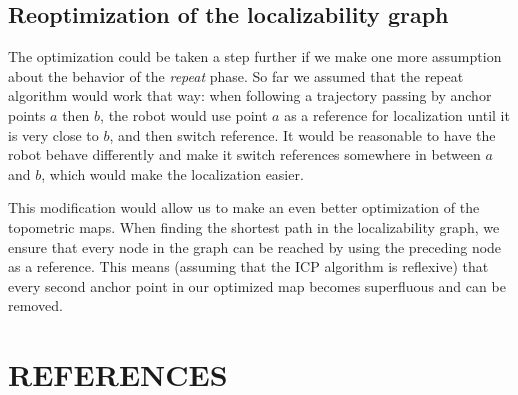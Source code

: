 \documentclass[letterpaper,10 pt,conference]{ieeeconf}
\begin{document}
\subsection{Reoptimization of the localizability graph}

The optimization could be taken a step further if we make one more assumption about the behavior
of the \textit{repeat} phase. So far we assumed that the repeat algorithm would work that way: when
following a trajectory passing by anchor points $a$ then $b$, the robot would use point $a$ as a
reference for localization until it is very close to $b$, and then switch reference. It would be
reasonable to have the robot behave differently and make it switch references somewhere in between
$a$ and $b$, which would make the localization easier.

This modification would allow us to make an even better optimization of the topometric maps. When
finding the shortest path in the localizability graph, we ensure that every node in the graph can be
reached by using the preceding node as a reference. This means (assuming that the ICP algorithm is
reflexive) that every second anchor point in our optimized map becomes superfluous and can be removed.

\section*{REFERENCES}
\printbibliography
\end{document}

